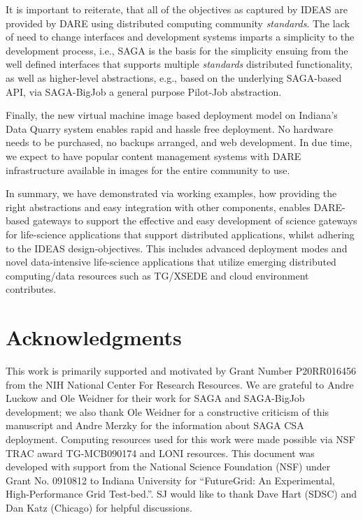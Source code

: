 \documentclass[]{svjour3}
\begin{document}
It is important to reiterate, that all of the objectives as captured
by IDEAS are provided by DARE using distributed computing community
{\it standards}. The lack of need to change interfaces and development
systems imparts a simplicity to the development process, i.e., SAGA is
the basis for the simplicity ensuing from the well defined interfaces
that supports multiple {\it standards} distributed functionality, as
well as higher-level abstractions, e.g., based on the underlying
SAGA-based API, via SAGA-BigJob a general purpose Pilot-Job
abstraction.

Finally, the new virtual machine image based deployment model on
Indiana's Data Quarry system enables rapid and hassle free
deployment. No hardware needs to be purchased, no backups arranged,
and web development. In due time, we expect to have popular content
management systems with DARE infrastructure available in images for
the entire community to use.

In summary, we have demonstrated via working examples, how providing
the right abstractions and easy integration with other components,
enables DARE-based gateways to support the effective and easy
development of science gateways for life-science applications that
support distributed applications, whilst adhering to the IDEAS
design-objectives. This includes advanced deployment modes and novel
data-intensive life-science applications that utilize emerging
distributed computing/data resources such as TG/XSEDE and cloud
environment contributes.

\section*{Acknowledgments}
This work is primarily supported and motivated by Grant Number
P20RR016456 from the NIH National Center For Research Resources. We
are grateful to Andre Luckow and Ole Weidner for their work for SAGA
and SAGA-BigJob development; we also thank Ole Weidner for a
constructive criticism of this manuscript and Andre Merzky for the information about SAGA CSA deployment. Computing resources used for this work were made possible via NSF TRAC award TG-MCB090174 and
LONI resources. This document was developed with support from the
National Science Foundation (NSF) under Grant No. 0910812 to Indiana
University for ``FutureGrid: An Experimental, High-Performance Grid
Test-bed.''. SJ would like to thank Dave Hart (SDSC) and Dan Katz
(Chicago) for helpful discussions.



%

%

\end{document}
